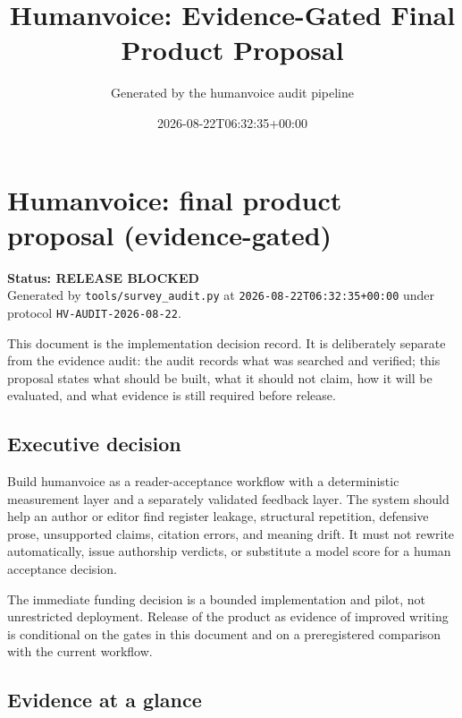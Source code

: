 \documentclass[11pt]{article}
\title{Humanvoice: Evidence-Gated Final Product Proposal}
\author{Generated by the humanvoice audit pipeline}
\date{2026-08-22T06:32:35+00:00}
\begin{document}
\hypertarget{humanvoice-final-product-proposal-evidence-gated}{%
\section{Humanvoice: final product proposal (evidence-gated)}\label{humanvoice-final-product-proposal-evidence-gated}}

\textbf{Status: RELEASE BLOCKED}\\
Generated by \texttt{tools/survey\_audit.py} at \texttt{2026-08-22T06:32:35+00:00} under protocol \texttt{HV-AUDIT-2026-08-22}.

This document is the implementation decision record. It is deliberately separate from the evidence audit: the audit records what was searched and verified; this proposal states what should be built, what it should not claim, how it will be evaluated, and what evidence is still required before release.

\hypertarget{executive-decision}{%
\subsection{Executive decision}\label{executive-decision}}

Build humanvoice as a reader-acceptance workflow with a deterministic measurement layer and a separately validated feedback layer. The system should help an author or editor find register leakage, structural repetition, defensive prose, unsupported claims, citation errors, and meaning drift. It must not rewrite automatically, issue authorship verdicts, or substitute a model score for a human acceptance decision.

The immediate funding decision is a bounded implementation and pilot, not unrestricted deployment. Release of the product as evidence of improved writing is conditional on the gates in this document and on a preregistered comparison with the current workflow.

\hypertarget{evidence-at-a-glance}{%
\subsection{Evidence at a glance}\label{evidence-at-a-glance}}
\end{document}
